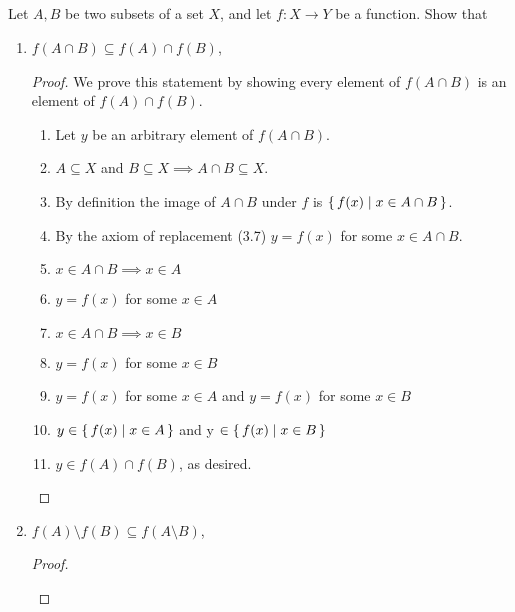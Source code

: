 \documentclass[../../main.tex]{subfiles}
\begin{document}
\subsection{}
\begin{q}
    Let $A, B$ be two subsets of a set $X$, and let $f : X \to Y$ be a function. Show that
    \begin{enumerate}
        \item $f(A \cap B) \subseteq f(A) \cap f(B)$,
        \begin{proof}
            We prove this statement by showing every element of $f(A \cap B)$ is an element of $f(A) \cap f(B)$.
            \begin{enumerate}
                \item Let $y$ be an arbitrary element of $f(A \cap B)$. 
                \item $A \subseteq X$ and $B \subseteq X \implies A \cap B \subseteq X$. 
                \item By definition the image of $A \cap B$ under $f$ is $\{\,f(x)\mid x \in A \cap B\,\}$. 
                \item By the axiom of replacement (3.7) $y=f(x)$ for some $x \in A \cap B$.
                \item $x \in A \cap B \implies x \in A$ 
                \item $y = f(x)$ for some $x \in A$
                \item $x \in A \cap B \implies x \in B$ 
                \item $y = f(x)$ for some $x \in B$
                \item $y = f(x)$ for some $x \in A$ and $y = f(x)$ for some $x \in B$
                \item $y \in \{\,f(x)\mid x \in A\,\}$ and y $\in \{\,f(x)\mid x \in B\,\}$
                \item $y \in f(A) \cap f(B)$, as desired.
            \end{enumerate}
        \end{proof}    

        \item $f(A) \setminus f(B) \subseteq f(A \setminus B)$,
        \begin{proof}

            \begin{xx}
                
            \end{xx}
        \end{proof}
        

\end{enumerate}
\end{q}
\end{document}
